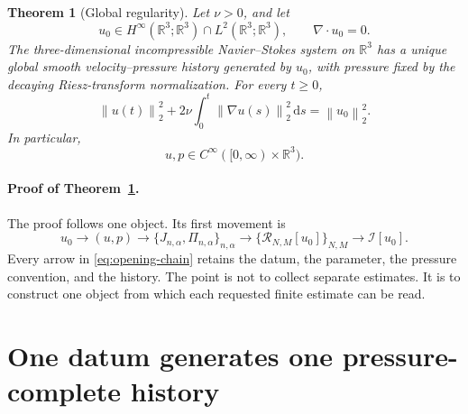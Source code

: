\documentclass[11pt,letterpaper]{article}
\newtheorem{theorem}{Theorem}
\theoremstyle{definition}
\theoremstyle{remark}
\newcommand{\R}{\mathbb R}
\newcommand{\cR}{\mathcal R}
\newcommand{\cI}{\mathcal I}
\newcommand{\norm}[1]{\left\lVert #1\right\rVert}
\newcommand{\dd}{\,\mathrm d}
\begin{document}
\begin{theorem}[Global regularity]
\label{thm:global}
Let \(\nu>0\), and let
\[
 u_0\in H^\infty(\R^3;\R^3)\cap L^2(\R^3;\R^3),
 \qquad \nabla\cdot u_0=0.
\]
The three-dimensional incompressible Navier{--}Stokes system on \(\R^3\)
has a unique global smooth velocity--pressure history generated by \(u_0\),
with pressure fixed by the decaying Riesz-transform normalization.  For
every \(t\ge0\),
\begin{equation}
\norm{u(t)}_2^2
+2\nu\int_0^t\norm{\nabla u(s)}_2^2\dd s
=\norm{u_0}_2^2.
\label{eq:global-energy}
\end{equation}
In particular,
\[
 u,p\in C^\infty([0,\infty)\times\R^3).
\]
\end{theorem}

\paragraph{Proof of Theorem~\ref{thm:global}.}
The proof follows one object.  Its first movement is
\begin{equation}
\boxed{
u_0
\longrightarrow (u,p)
\longrightarrow \{J_{n,\alpha},\Pi_{n,\alpha}\}_{n,\alpha}
\longrightarrow \{\cR_{N,M}[u_0]\}_{N,M}
\longrightarrow \cI[u_0].}
\label{eq:opening-chain}
\end{equation}
Every arrow in \eqref{eq:opening-chain} retains the datum, the parameter,
the pressure convention, and the history.  The point is not to collect
separate estimates.  It is to construct one object from which each requested
finite estimate can be read.

\section{One datum generates one pressure-complete history}
\end{document}
